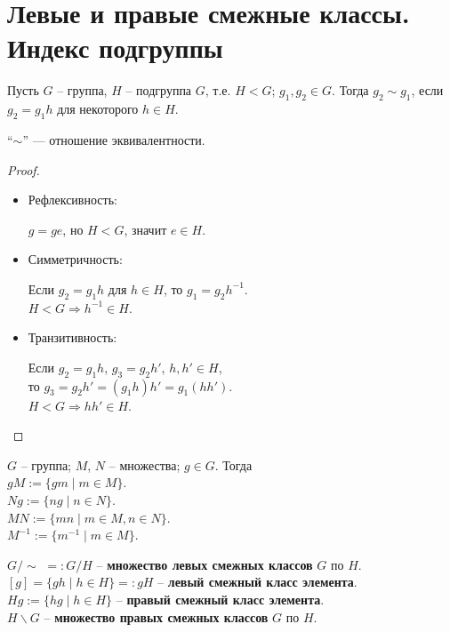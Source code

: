 \section{Левые и правые смежные классы. Индекс подгруппы}
\begin{conj}
    Пусть $G$ -- группа, $H$ -- подгруппа $G$, т.е. $H < G$;
    $g_1, g_2 \in G$. Тогда $g_2 \sim g_1$, если $g_2 = g_1 h$ для
    некоторого $h \in H$.
\end{conj}

\begin{theorem-non}
    ``$\sim$'' --- отношение эквивалентности.
\end{theorem-non}
\begin{proof} $ $

    \begin{itemize}
        \item Рефлексивность:
        
        $g = ge$, но $H < G$, значит $e \in H$.

        \item Симметричность:
        
        Если $g_2 = g_1 h$ для $h \in H$, то $g_1 = g_2 h^{-1}$. \\
        $H < G \Rightarrow h^{-1} \in H$.

        \item Транзитивность:
        
        Если $g_2 = g_1 h$, $g_3 = g_2 h'$, $h, h' \in H$, \\
        то $g_3 = g_2 h' = (g_1 h) h' = g_1 (hh')$. \\
        $H < G \Rightarrow hh' \in H$.

    \end{itemize}
\end{proof}

\begin{conj} $ $\\
    $G$ -- группа; $M$, $N$ -- множества; $g \in G$. Тогда \\
    $gM := \{ gm \mid m \in M \}$. \\
    $Ng := \{ ng \mid n \in N \}$. \\
    $MN := \{ mn \mid m \in M, n \in N \}$. \\
    $M^{-1} := \{ m^{-1} \mid m \in M \}$.
\end{conj}

\begin{conj} $ $\\
    $G/\sim \,\, =: G/H$ -- \textbf{множество левых 
    смежных классов} $G$ по $H$. \\
    $[g] = \{ gh \mid h \in H \} =: gH$ -- 
    \textbf{левый смежный класс элемента}. \\
    $Hg := \{ hg \mid h \in H \}$ -- 
    \textbf{правый смежный класс элемента}. \\
    $H \backslash G$ -- \textbf{множество правых 
    смежных классов} $G$ по $H$. \\
\end{conj}

